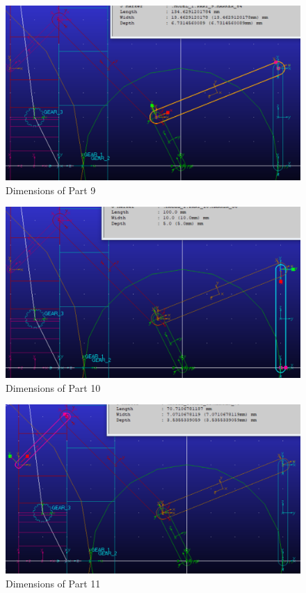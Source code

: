                 \begin{figure}[hbt!]
                    \centering
                    \includegraphics[width=0.9\columnwidth]{Images/dim9.png}
                    \caption{Dimensions of Part 9}
                    \label{fig:dim9}
                \end{figure}

                \begin{figure}[hbt!]
                    \centering
                    \includegraphics[width=0.9\columnwidth]{Images/dim10.png}
                    \caption{Dimensions of Part 10}
                    \label{fig:dim10}
                \end{figure}

                \begin{figure}[hbt!]
                    \centering
                    \includegraphics[width=0.9\columnwidth]{Images/dim11.png}
                    \caption{Dimensions of Part 11}
                    \label{fig:dim11}
                \end{figure}

